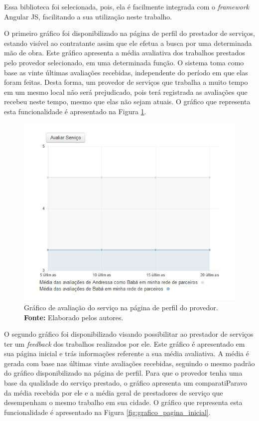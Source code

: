 \par Essa biblioteca foi selecionada, pois, ela é facilmente integrada com o \textit{framework} Angular JS, facilitando a sua utilização neste trabalho. 

\par O primeiro gráfico foi disponibilizado na página de perfil do prestador de serviços, estando visível ao contratante assim que ele efetua a busca por uma determinada mão de obra. Este gráfico apresenta a média avaliativa dos trabalhos prestados pelo provedor selecionado, em uma determinada função. O sistema toma como base as vinte últimas avaliações recebidas, independente do período em que elas foram feitas. Desta forma, um provedor de serviços que trabalha a muito tempo em um mesmo local não será prejudicado, pois terá registrada as avaliações que recebeu neste tempo, mesmo que elas não sejam atuais. O gráfico que representa esta funcionalidade é apresentado na Figura \ref{fig:grafico_pagina_perfil}.

\newpage
\begin{figure}[h!]
	\centerline{\includegraphics[scale=0.65]{./imagens/grafico-pagina-perfil.png}}
	\caption[Gráfico de avaliação do serviço na página de perfil do provedor.]
	{Gráfico de avaliação do serviço na página de perfil do provedor. \textbf{Fonte:} Elaborado pelos autores.}
	\label{fig:grafico_pagina_perfil}
\end{figure}

\par O segundo gráfico foi disponibilizado visando possibilitar ao prestador de serviços ter um \textit{feedback} dos trabalhos realizados por ele. Este gráfico é apresentado em sua página inicial e trás informações referente a sua média avaliativa. A média é gerada com base nas últimas vinte avaliações recebidas, seguindo o mesmo padrão do gráfico disponibilizado na página de perfil. Para que o provedor tenha uma base da qualidade do serviço prestado, o gráfico apresenta um comparatiParavo da média recebida por ele e a média geral de prestadores de serviço que desempenham o mesmo trabalho em sua cidade. O gráfico que representa esta funcionalidade é apresentado na Figura \ref{fig:grafico_pagina_inicial}.

